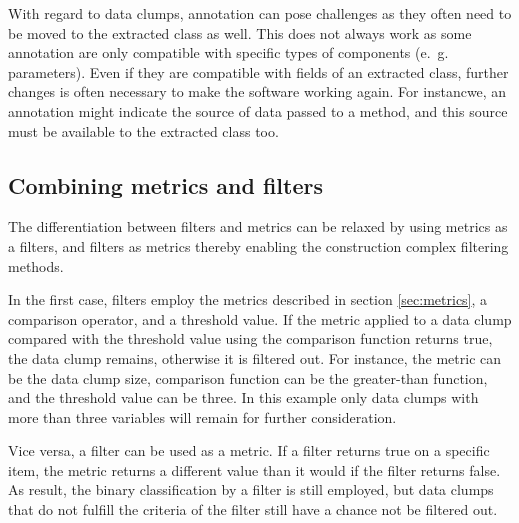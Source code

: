 With regard to data clumps, annotation can pose challenges as they often need to be moved to the extracted class as well. This does not always work as some annotation are only compatible with specific types of components (e.~g. parameters). Even if they are compatible with fields of an extracted class, further changes is often necessary to make the software working again. For instancwe, an annotation might indicate the source of data passed to a method, and this source must be available to the extracted class too. 

\subsection{Combining metrics and filters}

The differentiation between filters and metrics can be relaxed by using metrics as a filters, and filters as metrics thereby enabling the construction complex filtering methods. 

In the first case, filters employ the metrics described in section \ref{sec:metrics}, a comparison operator, and a threshold value. If the metric applied to a data clump compared with the threshold value using the comparison function returns true, the data clump remains, otherwise it is filtered out. For instance, the metric can be the data clump size, comparison function can be the greater-than function, and the threshold value can be three. In this example only data clumps with more than three variables will remain for further consideration. 

Vice versa, a filter can be used as a metric. If a filter returns true on a specific item, the metric returns a different value than it would if the filter returns false. As result, the binary classification by a filter is still employed, but data clumps that do not fulfill the criteria of the filter still have a chance not be filtered out. 

